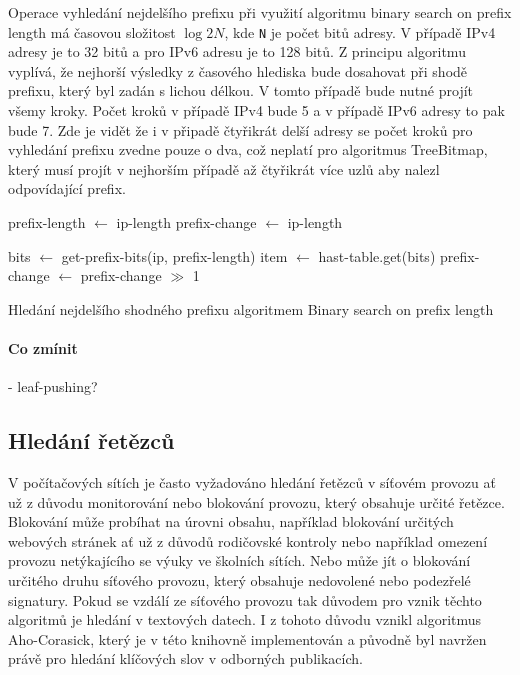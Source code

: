Operace vyhledání nejdelšího prefixu při využití algoritmu binary search on prefix length má časovou
složitost $\log{2}{N}$, kde \texttt{N} je počet bitů adresy. V případě IPv4 adresy je to 32 bitů a pro IPv6
adresu je to 128 bitů. Z principu algoritmu vyplívá, že nejhorší výsledky z časového hlediska bude dosahovat
při shodě prefixu, který byl zadán s lichou délkou. V tomto případě bude nutné projít všemy kroky.
Počet kroků v případě IPv4 bude 5 a v případě IPv6 adresy to pak bude 7.
Zde je vidět že i v připadě čtyřikrát delší adresy se počet kroků pro vyhledání prefixu zvedne pouze o dva,
což neplatí pro algoritmus TreeBitmap, který musí projít v nejhorším případě až čtyřikrát více
uzlů aby nalezl odpovídající prefix.
\cite{bspl}

\begin{algorithm}
	prefix-length $\leftarrow$ ip-length\;
	prefix-change $\leftarrow$ ip-length\;
	{
		bits $\leftarrow$ get-prefix-bits(ip, prefix-length)\;
		item $\leftarrow$ hast-table.get(bits)\;
		prefix-change $\leftarrow$ prefix-change $\gg$ 1\;

	}
	\caption{Hledání nejdelšího shodného prefixu algoritmem Binary search on prefix length}
\end{algorithm}

\paragraph{Co zmínit}
- leaf-pushing?

\subsection{Hledání řetězců}
V počítačových sítích je často vyžadováno hledání řetězců v síťovém provozu ať už z důvodu monitorování
nebo blokování provozu, který obsahuje určité řetězce. Blokování může probíhat na úrovni obsahu, například
blokování určitých webových stránek ať už z důvodů rodičovské kontroly nebo například omezení provozu
netýkajícího se výuky ve školních sítích. Nebo může jít o blokování určitého druhu síťového provozu,
který obsahuje nedovolené nebo podezřelé signatury. Pokud se vzdálí ze síťového provozu tak
důvodem pro vznik těchto algoritmů je hledání v textových datech. I z tohoto důvodu vznikl
algoritmus Aho-Corasick, který je v této knihovně implementován a původně byl navržen
právě pro hledání klíčových slov v odborných publikacích.

